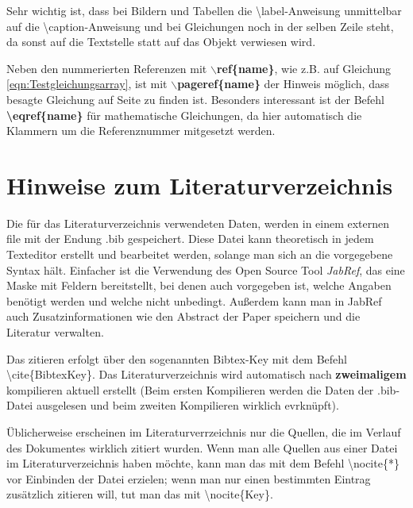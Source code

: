 			Sehr wichtig ist, dass bei Bildern und Tabellen die
			\textbackslash label-Anweisung unmittelbar auf die
			\textbackslash caption-Anweisung und bei Gleichungen noch in der
			selben Zeile steht, da sonst auf die Textstelle statt auf das
			Objekt verwiesen wird.
			
			Neben den nummerierten Referenzen mit \textbf{$\backslash$ref\{name\}}, wie z.B. auf Gleichung
			\ref{eqn:Testgleichungsarray}, ist mit \textbf{$\backslash$pageref\{name\}} der Hinweis möglich, dass
			besagte Gleichung auf Seite \pageref{eqn:Testgleichungsarray} zu finden ist. Besonders interessant ist 
			der Befehl \textbf{\textbackslash eqref\{name\}} für mathematische Gleichungen, da hier automatisch die Klammern um die
			Referenznummer mitgesetzt werden.
			
		
		\section {Hinweise zum Literaturverzeichnis}
			
			Die für das Literaturverzeichnis verwendeten Daten, werden in einem externen file mit der Endung .bib gespeichert. Diese Datei kann theoretisch in jedem Texteditor erstellt und bearbeitet werden, solange man sich an die vorgegebene Syntax hält. 
			Einfacher ist die Verwendung des Open Source Tool \emph{JabRef}, das eine Maske mit Feldern bereitstellt, bei denen auch vorgegeben ist, welche Angaben benötigt werden und welche nicht unbedingt. Außerdem kann man in JabRef auch Zusatzinformationen wie den Abstract der Paper speichern und die Literatur verwalten.
			
			Das zitieren erfolgt über den sogenannten Bibtex-Key mit dem Befehl \textbackslash cite\{BibtexKey\}. Das Literaturverzeichnis wird automatisch nach \textbf{zweimaligem} kompilieren aktuell erstellt (Beim ersten Kompilieren werden die Daten der .bib-Datei ausgelesen und beim zweiten Kompilieren wirklich evrknüpft). 
			
			Üblicherweise erscheinen im Literaturverrzeichnis nur die Quellen, die im Verlauf des Dokumentes wirklich zitiert wurden. Wenn man alle Quellen aus einer Datei im Literaturverzeichnis haben möchte, kann man das mit dem Befehl \textbackslash nocite\{*\} vor Einbinden der Datei erzielen; wenn man nur einen bestimmten Eintrag zusätzlich zitieren will, tut man das mit \textbackslash nocite\{Key\}.
			


		